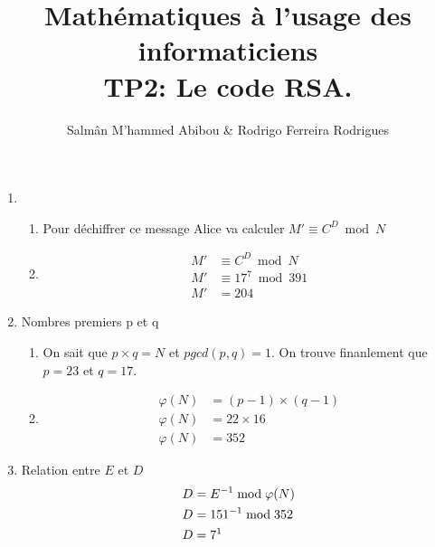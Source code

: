 \documentclass{homework}
\title{Mathématiques à l'usage des informaticiens\\
TP2: Le code RSA.}
\author{Salmân M'hammed Abibou \& Rodrigo Ferreira Rodrigues}
\begin{document}
	\maketitle
	\onehalfspacing
	\exercise
		\begin{enumerate}
    	\item 
    		\begin{enumerate}
    			\item Pour déchiffrer ce message Alice va calculer $ M' \equiv C^D \bmod N $
    			\item 
    				\begin{equation*}
    					\begin{split}    				
    				M' &\equiv C^{D} \bmod N \\
    				M' & \equiv 17^7 \bmod 391 \\
    				M' & = 204
    					\end{split}
    				\end{equation*}
   			\end{enumerate}
   		
   		\item Nombres premiers p et q
   		
			\begin{enumerate}
    			\item On sait que $p\times q = N$  et $pgcd(p,q) = 1$. On trouve finanlement que $p = 23$ et $q = 17$.
    			\item 
    				\begin{equation*}
    					\begin{split}    				
    				\varphi(N) & = (p-1) \times (q-1)\\
    				\varphi(N) & = 22 \times 16 \\
    				\varphi(N) & = 352
    					\end{split}
    				\end{equation*}
   			\end{enumerate}   	
   		
   		\item Relation entre $E$ et $D$
   			\begin{equation*}
   				\begin{split}
   					D & = E^{-1} \bmod \varphi(N) \\
   					D & = 151^{-1} \bmod 352 \\
   					D & = 7\text{\footnotemark}
   				\end{split}
   			\end{equation*}
		\end{enumerate}
\end{document}
